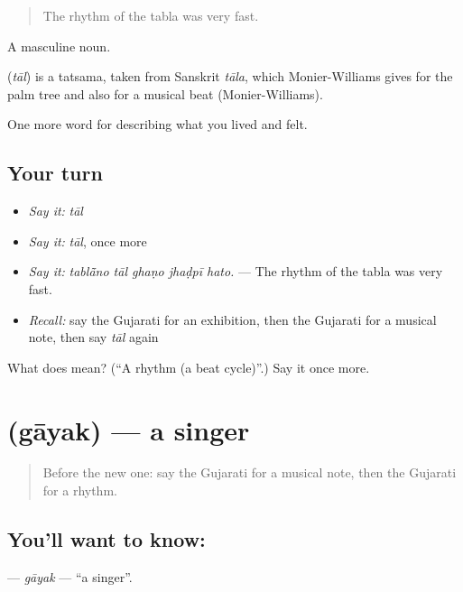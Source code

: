 \begin{quote}
The rhythm of the tabla was very fast.
\end{quote}

A masculine noun.

\begin{cousinweb}
\textbf{} (\emph{tāl}) is a tatsama, taken from Sanskrit \emph{tāla}, which Monier-Williams gives for the palm tree and also for a musical beat (Monier-Williams).
\end{cousinweb}

\begin{grammarlens}[title={What you've built}]
One more word for describing what you lived and felt.
\end{grammarlens}

\subsection*{Your turn}
\begin{itemize}
\raggedright
  \item \emph{Say it:} \emph{tāl}
  \item \emph{Say it:} \emph{tāl}, once more
  \item \emph{Say it:} \emph{tablā̃no tāl ghaṇo jhaḍpī hato.} — The rhythm of the tabla was very fast.
  \item \emph{Recall:} say the Gujarati for an exhibition, then the Gujarati for a musical note, then say \emph{tāl} again
\end{itemize}

\begin{tcolorbox}[breakable,colback=teal!4,colframe=teal!35!black,title={Before you move on}]
What does  mean? (\textquotedblleft{}A rhythm (a beat cycle)\textquotedblright{}.) Say it once more.
\end{tcolorbox}
\section[\texorpdfstring{\gu{ગાયક} (gāyak)}{ગાયક (gāyak)}]{ (gāyak) — a singer}

\label{lesson:GU-C526-gayak}



\begin{quote}
Before the new one: say the Gujarati for a musical note, then the Gujarati for a rhythm.
\end{quote}

\subsection*{You'll want to know: }
\textbf{} — \emph{gāyak} — \textquotedblleft{}a singer\textquotedblright{}.

